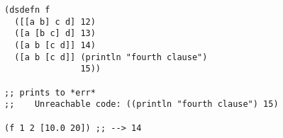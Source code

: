\begin{lstlisting}[style=reclojureClojure,frame=single]
(dsdefn f 
  ([[a b] c d] 12)
  ([a [b c] d] 13)
  ([a b [c d]] 14)
  ([a b [c d]] (println "fourth clause") 
               15))

;; prints to *err*
;;    Unreachable code: ((println "fourth clause") 15)

(f 1 2 [10.0 20]) ;; --> 14
\end{lstlisting}
